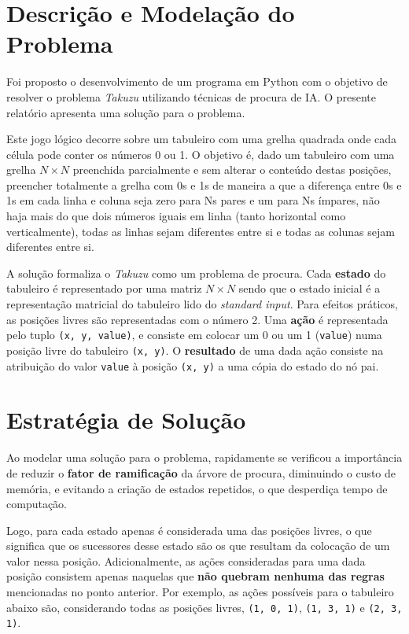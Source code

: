 \documentclass[12pt,a4paper]{article}
\begin{document}
\section{Descrição e Modelação do Problema}

Foi proposto o desenvolvimento de um programa em Python com o objetivo de resolver o
problema \textit{Takuzu} utilizando técnicas de procura de IA.
O presente relatório apresenta uma solução para o problema.

Este jogo lógico decorre sobre um tabuleiro com uma grelha quadrada onde cada célula
pode conter os números 0 ou 1.
O objetivo é, dado um tabuleiro com uma grelha \(N \times N\) preenchida parcialmente e
sem alterar o conteúdo destas posições, preencher totalmente a grelha com 0s e 1s de maneira
a que a diferença entre 0s e 1s em cada linha e coluna seja zero para Ns pares e um para Ns ímpares,
não haja mais do que dois números iguais em linha (tanto horizontal como verticalmente),
todas as linhas sejam diferentes entre si e todas as colunas sejam diferentes entre si.

A solução formaliza o \textit{Takuzu} como um problema de procura.
Cada \textbf{estado} do tabuleiro é representado por uma matriz \(N \times N\) sendo que o estado inicial
é a representação matricial do tabuleiro lido do \textit{standard input}.
Para efeitos práticos, as posições livres são representadas com o número 2.
Uma \textbf{ação} é representada pelo tuplo \texttt{(x, y, value)}, e consiste em colocar um 0 ou um 1 (\texttt{value})
numa posição livre do tabuleiro \texttt{(x, y)}. O \textbf{resultado} de uma dada ação consiste na
atribuição do valor \texttt{value} à posição \texttt{(x, y)} a uma cópia do estado do nó pai.

\section{Estratégia de Solução}

Ao modelar uma solução para o problema, rapidamente se verificou a importância de reduzir
o \textbf{fator de ramificação} da árvore de procura, diminuindo o custo de memória,
e evitando a criação de estados repetidos, o que desperdiça tempo de computação.

Logo, para cada estado apenas é considerada uma das posições livres, o que significa
que os sucessores desse estado são os que resultam da colocação de um valor nessa posição.
Adicionalmente, as ações consideradas para uma dada posição consistem apenas naquelas que
\textbf{não quebram nenhuma das regras} mencionadas no ponto anterior.
Por exemplo, as ações possíveis para o tabuleiro abaixo são, considerando todas as posições livres,
\texttt{(1, 0, 1)}, \texttt{(1, 3, 1)} e \texttt{(2, 3, 1)}.
\end{document}
